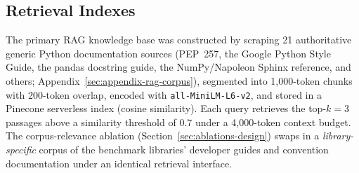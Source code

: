 \documentclass[pdflatex,sn-mathphys-ay]{sn-jnl}%
\theoremstyle{thmstyleone}%
\theoremstyle{thmstyletwo}%
\theoremstyle{thmstylethree}%
\begin{document}
\subsection{Retrieval Indexes}
\label{sec:retrieval-index}
The primary RAG knowledge base was constructed by scraping 21 authoritative generic Python documentation sources (PEP~257, the Google Python Style Guide, the pandas docstring guide, the NumPy/Napoleon Sphinx reference, and others; Appendix~\ref{sec:appendix-rag-corpus}), segmented into 1,000-token chunks with 200-token overlap, encoded with \texttt{all-MiniLM-L6-v2}, and stored in a Pinecone serverless index (cosine similarity). Each query retrieves the top-$k=3$ passages above a similarity threshold of $0.7$ under a 4,000-token context budget. {\color{blue}
The corpus-relevance ablation (Section~\ref{sec:ablations-design}) swaps in a \emph{library-specific} corpus of the benchmark libraries' developer guides and convention documentation under an identical retrieval interface.
}
\end{document}
